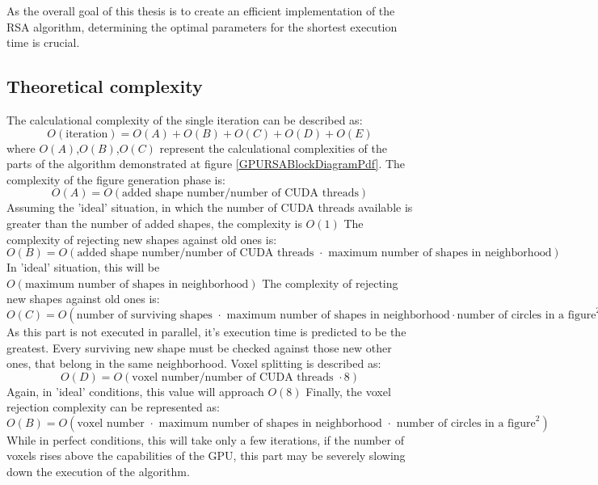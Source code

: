 \documentclass[12pt, oneside]{report}
\begin{document}
As the overall goal of this thesis is to create an efficient implementation of the RSA algorithm, determining the optimal parameters for the shortest execution time is crucial.

\subsection{Theoretical complexity}

The calculational complexity of the single iteration can be described as: \newline
\begin{equation*}
	O(\text{iteration}) = O(A)+O(B)+O(C)+O(D)+O(E)
\end{equation*}
where $O(A)$,$O(B)$,$O(C)$ represent the calculational complexities of the parts of the algorithm demonstrated at figure \ref{GPURSABlockDiagramPdf}. The complexity of the figure generation phase is:
\begin{equation*}
	O(A) = O(\text{added shape number}/ \text{number of CUDA threads})
\end{equation*}
Assuming the 'ideal' situation, in which the number of CUDA threads available is greater than the number of added shapes, the complexity is $O(1)$ \newline
The complexity of rejecting new shapes against old ones is: \newline
\begin{equation*}
	O(B) = O(\text{added shape number}/ \text{number of CUDA threads } \cdot \text{ maximum number of shapes in neighborhood})
\end{equation*}
In 'ideal' situation, this will be $O(\text{maximum number of shapes in neighborhood})$ \newline
The complexity of rejecting new shapes against old ones is: \newline
\begin{equation*}
	O(C) = O(\text{number of surviving shapes } \cdot \text{ maximum number of shapes in neighborhood} \cdot \text{number of circles in a figure}^2)
\end{equation*}
As this part is not executed in parallel, it's execution time is predicted to be the greatest. Every surviving new shape must be checked against those new other ones, that belong in the same neighborhood. \newline
Voxel splitting is described as: \newline
\begin{equation*}
	O(D) = O(\text{voxel number}/ \text{number of CUDA threads } \cdot 8)
\end{equation*}
Again, in 'ideal' conditions, this value will approach $O(8)$ \newline
Finally, the voxel rejection complexity can be represented as:
\begin{equation*}
	O(B) = O(\text{voxel number } \cdot \text{ maximum number of shapes in neighborhood } \cdot \text{ number of circles in a figure}^2)
\end{equation*}
While in perfect conditions, this will take only a few iterations, if the number of voxels rises above the capabilities of the GPU, this part may be severely slowing down the execution of the algorithm.
\end{document}
